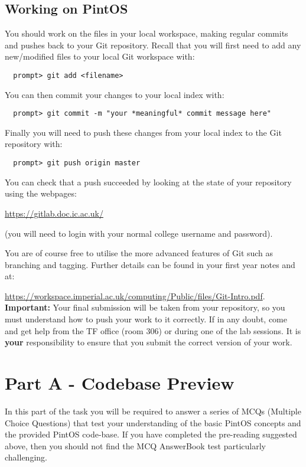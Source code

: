 \documentclass[a4paper,11pt]{article}
\begin{document}
\subsection*{Working on PintOS}
You should work on the files in your local workspace, making regular commits and pushes back to your  Git repository.
Recall that you will first need to add any new/modified files to your local Git workspace with:
%
\begin{verbatim}
  prompt> git add <filename>
\end{verbatim}
%
You can then commit your changes to your local index with:
%
\begin{verbatim}
  prompt> git commit -m "your *meaningful* commit message here"
\end{verbatim}
%
Finally you will need to push these changes from your local index to the Git repository with:
%
\begin{verbatim}
  prompt> git push origin master
\end{verbatim}
%
You can check that a push succeeded by looking at the state of your repository using the  webpages: 

\url{https://gitlab.doc.ic.ac.uk/}

\noindent (you will need to login with your normal college username and password).

You are of course free to utilise the more advanced features of Git such as branching and tagging.
Further details can be found in your first year notes and at:

\url{https://workspace.imperial.ac.uk/computing/Public/files/Git-Intro.pdf}.\\

{\bf Important:} Your final submission will be taken from your   repository, 
so you must understand how to push your work to it correctly. 
If in any doubt, come and get help from the TF office (room 306) or during one of the lab sessions.
It is {\bf your} responsibility to ensure that you submit the correct version of your work.


\section*{Part A - Codebase Preview}
In this part of the task you will be required to answer a series of MCQs (Multiple Choice Questions) that test your understanding of the basic PintOS concepts and the provided PintOS code-base.
If you have completed the pre-reading suggested above, then you should not find the MCQ AnswerBook test particularly challenging.
\end{document}
